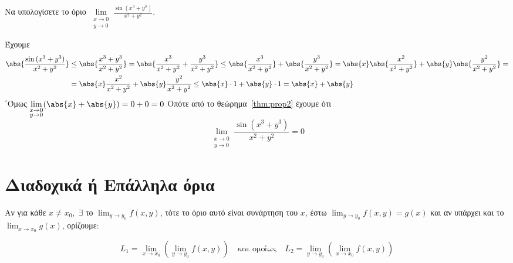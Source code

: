 \documentclass[a4paper,11pt]{report}
\begin{document}
  \begin{example}
    Να υπολογίσετε το όριο $ \lim\limits_{\substack{x\to 0 \\y \to 0}}
    \frac{\sin{(x^{3}+y^{3})}}{x^{2}+y^{2}} $.
    \begin{solution}
      Έχουμε 
      \begin{align*}
        \abs{\frac{\sin{(x^{3}+y^3)}}{x^{2}+y^{2}}} 
      &\leq \abs{\frac{x^{3}+y^{3}}{x^{2}+y^{2}}} = \abs{\frac{x^{3}}{x^{2}+y^2} +
      \frac{y^{3}}{x^{2}+y^{2}}} \leq \abs{\frac{x^{3}}{x^{2}+y^{2}}} +
      \abs{\frac{y^{3}}{x^{2}+y^{2}}}  
      = \abs{x} \abs{\frac{x^{2}}{x^{2}+y^{2}}} +
      \abs{y} \abs{\frac{y^{2}}{x^{2}+y^{2}}} = \\ 
      &= \abs{x} \frac{x^{2}}{x^{2}+y^{2}} + \abs{y} \frac{y^{2}}{x^{2}+y^{2}} 
      \leq \abs{x}\cdot 1 + \abs{y} \cdot 1 = \abs{x} + \abs{y}
      \end{align*} 
      ΄Όμως $ \lim\limits_{\substack{x\to 0 \\y \to 0}} (\abs{x} + \abs{y} ) = 0 + 0 = 0$ 
      Οπότε από το θεώρημα~\ref{thm:prop2} έχουμε ότι 
      \[
        \lim\limits_{\substack{x\to 0 \\y \to 0}} \frac{\sin{(x^{3}+y^{3})}}{x^{2}+y^{2}} =
        0 
      \] 
    \end{solution}
  \end{example}

  \section{Διαδοχικά ή Επάλληλα όρια}

  \begin{mybox1}
    \begin{dfn}
      Αν για κάθε $ x \neq x_{0}, \; \exists $ το $ \lim_{y \to y_{0}} f(x,y) $, τότε το 
      όριο αυτό είναι συνάρτηση του $x$, έστω $ \lim_{y \to y_{0}} f(x,y) = g(x) $ και 
      αν υπάρχει και το $ \lim_{x \to x_{0}} g(x) $, ορίζουμε: 

      \[
        L_{1} = \lim_{x \to x_{0}} \left(\lim_{y \to y_{0}} f(x,y)\right) 
        \quad \text{και ομοίως} \quad
        L_{2} = \lim_{y \to y_{0}} \left(\lim_{x \to x_{0}} f(x,y)\right) 
      \] 
    \end{dfn}
  \end{mybox1}
\end{document}
